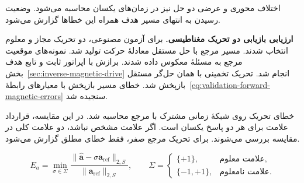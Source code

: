 اختلاف محوری و عرضی دو حل نیز در زمان‌های یکسان محاسبه می‌شود.
وضعیت رسیدن به انتهای مسیر هدف همراه این خطاها گزارش می‌شود.

\textbf{ارزیابی بازیابی دو تحریک مغناطیسی.}
برای آزمون مصنوعی، دو تحریک مجاز و معلوم انتخاب شدند.
مسیر مرجع با حل مستقل معادلهٔ حرکت تولید شد.
نمونه‌های موقعیت مرجع به مسئلهٔ معکوس داده شدند.
برازش با اپراتور ثابت و تابع هدف بخش~\ref{sec:inverse-magnetic-drive} انجام شد.
تحریک تخمینی با همان حل‌گر مستقل بازپخش شد.
خطای مسیر بازپخش با معیارهای رابطهٔ~\eqref{eq:validation-forward-magnetic-errors} سنجیده شد.

خطای تحریک روی شبکهٔ زمانی مشترک با مرجع محاسبه شد.
در این مقایسه، قرارداد علامت برای هر دو پاسخ یکسان است.
اگر علامت مشخص نباشد، دو علامت کلی در مقایسه بررسی می‌شوند.
برای تحریک مرجع صفر، فقط خطای مطلق گزارش می‌شود.

\begin{equation}
E_a=
\min_{\sigma\in\Sigma}
\frac{\|\widehat{\mathbf a}-\sigma\mathbf a_{\mathrm{ref}}\|_{2,S}}
{\|\mathbf a_{\mathrm{ref}}\|_{2,S}},
\qquad
\Sigma=
\begin{cases}
\{+1\}, & \text{علامت معلوم},\\
\{-1,+1\}, & \text{علامت نامعلوم}.
\end{cases}
\label{eq:validation-master10-proposed-recovery}
\end{equation}

